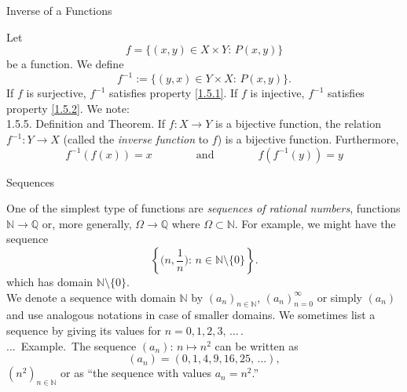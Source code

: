 \documentclass[smaller,hyperref={CJKbookmarks=true}]{beamer}
\newcommand{\N}{\mathbb{N}} \newcommand{\Z}{\mathbb{Z}} \newcommand{\Q}{\mathbb{Q}}
\newcounter{zhuo}[subsection]
\renewcommand{\thezhuo}{\thesection.\thesubsection.\arabic{zhuo}}
\newenvironment{EXAMPLE}{\stepcounter{zhuo}\alert{\!\thezhuo.~Example.\,}}{}
\begin{document}
\begin{frame}[t]{Inverse of a Functions}
\begin{spacing}{1.1}
Let
\[f=\{(x,y)\in X\times Y:\,P(x,y)\}\]
be a function. We define
\[f^{-1}:=\{(y,x)\in Y\times X:\,P(x,y)\}.\]
If $f$ is surjective, $f^{-1}$ satisfies property \eqref{1.5.1}. If $f$ is injective, $f^{-1}$ satisfies property \eqref{1.5.2}. We note:\\[5pt]
\alert{1.5.5. Definition and Theorem.} If $f:X\to Y$ is a bijective function, the relation $f^{-1}:Y\to X$ (called the \emph{inverse function} to $f$) is a bijective function. Furthermore,
\[f^{-1}(f(x))=x\qquad\qquad\text{and}
\qquad\qquad f(f^{-1}(y))=y\]
\end{spacing}
\end{frame}
\begin{frame}[t]{Sequences}
\begin{spacing}{1.05}
One of the simplest type of functions are \emph{sequences of rational numbers},
functions $\N\to\Q$ or, more generally, $\Omega\to\Q$ where $\Omega\subset\N$. For example, we might have the sequence
\[\left\{\Big(n,\frac{1}{n}\Big):\,n\in\N\setminus\{0\}\right\}.\]
which has domain $\N\setminus\{0\}$.\\[4pt]
We denote a sequence with domain $\N$ by $(a_n)_{n\in\N}$, $(a_n)_{n=0}^\infty$ or simply $(a_n)$ and use analogous notations in case of smaller domains. We sometimes list a sequence by giving its values for $n=0,1,2,3,\,...\,.$\\[4pt]
\begin{EXAMPLE}
  The sequence $(a_n)\!:\,n\mapsto n^2$ can be written as
  \[(a_n)=(0,1,4,9,16,25,\,...),\]
  $(n^2)_{n\in\N}$ or as ``the sequence with values $a_n=n^2$.''
\end{EXAMPLE}
\end{spacing}
\end{frame}
\end{document}
